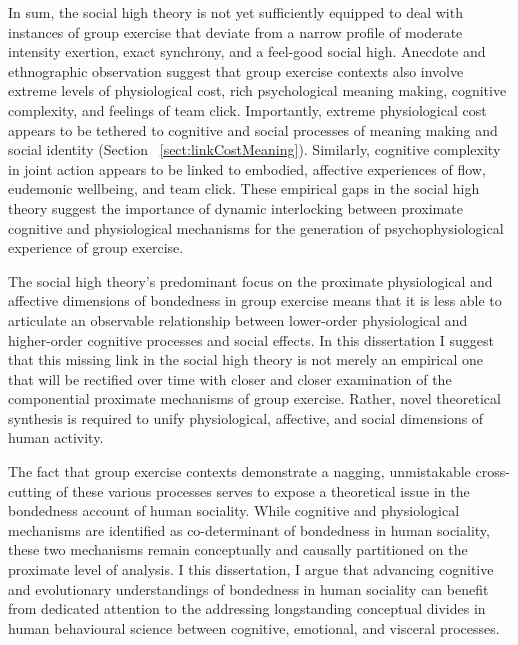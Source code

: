 \begin{CJK}{UTF8}{gbsn}
In sum, the social high theory is not yet sufficiently equipped to deal with instances of group exercise that deviate from a narrow profile of moderate intensity exertion, exact synchrony, and a feel-good social high.  Anecdote and ethnographic observation suggest that group exercise contexts also involve extreme levels of physiological cost, rich psychological meaning making, cognitive complexity, and feelings of team click.  Importantly, extreme physiological cost appears to be tethered to cognitive and social processes of meaning making and social identity (Section ~\ref{sect:linkCostMeaning}).  Similarly, cognitive complexity in joint action appears to be linked to embodied, affective experiences of flow, eudemonic wellbeing, and team click.  These empirical gaps in the social high theory suggest the importance of dynamic interlocking between proximate cognitive and physiological mechanisms for the generation of psychophysiological experience of group exercise.

The social high theory's predominant focus on the proximate physiological and affective dimensions of bondedness in group exercise means that it is less able to articulate an observable relationship between lower-order physiological and higher-order cognitive processes and social effects. In this dissertation I suggest that this missing link in the social high theory is not merely an empirical one that will be rectified over time with closer and closer examination of the componential proximate mechanisms of group exercise. Rather, novel theoretical synthesis is required to unify physiological, affective, and social dimensions of human activity.

The fact that group exercise contexts demonstrate a nagging, unmistakable cross-cutting of these various processes serves to expose a theoretical issue in the bondedness account of human sociality. While cognitive and physiological mechanisms are identified as co-determinant of bondedness in human sociality, these two mechanisms remain conceptually and causally partitioned on the proximate level of analysis.  I this dissertation, I argue that advancing cognitive and evolutionary understandings of bondedness in human sociality can benefit from dedicated attention to the addressing longstanding conceptual divides in human behavioural science between cognitive, emotional, and visceral processes.




\end{CJK}
